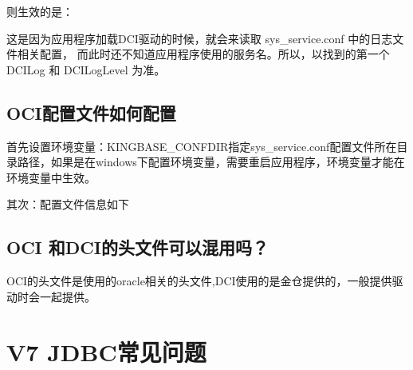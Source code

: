 \documentclass[letterpaper,10pt,english]{sphinxmanual}
\begin{document}
则生效的是：

\begin{sphinxVerbatim}[commandchars=\\\{\}]
\PYG{p}{[}\PYG{p}{]}
\end{sphinxVerbatim}

这是因为应用程序加载DCI驱动的时候，就会来读取 sys\_service.conf 中的日志文件相关配置，  而此时还不知道应用程序使用的服务名。所以，以找到的第一个 DCILog 和 DCILogLevel 为准。


\subsection{OCI配置文件如何配置}
\label{\detokenize{interface/oci-v7:id3}}
首先设置环境变量：KINGBASE\_CONFDIR指定sys\_service.conf配置文件所在目录路径，如果是在windows下配置环境变量，需要重启应用程序，环境变量才能在环境变量中生效。

其次：配置文件信息如下

\begin{sphinxVerbatim}[commandchars=\\\{\}]
\PYG{p}{[}\PYG{p}{]}
\end{sphinxVerbatim}


\subsection{OCI 和DCI的头文件可以混用吗？}
\label{\detokenize{interface/oci-v7:oci-dci}}
OCI的头文件是使用的oracle相关的头文件,DCI使用的是金仓提供的，一般提供驱动时会一起提供。


\section{V7 JDBC常见问题}
\label{\detokenize{interface/jdbc-v7:v7-jdbc}}\label{\detokenize{interface/jdbc-v7::doc}}
\end{document}
